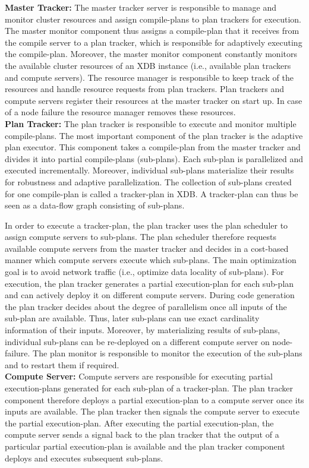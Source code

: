 \documentclass{sig-alternate}
\begin{document}
{\bf Master Tracker:} The master tracker server is responsible to manage and monitor cluster resources and assign compile-plans to plan trackers for execution. The master monitor component thus assigns a compile-plan that it receives from the compile server to a plan tracker, which is responsible for adaptively executing the compile-plan. Moreover, the master monitor component constantly monitors the available cluster resources of an XDB instance (i.e., available plan trackers and compute servers). The resource manager is responsible to keep track of the resources and handle resource requests from plan trackers. Plan trackers and compute servers register their resources at the master tracker on start up. In case of a node failure the resource manager removes these resources. \\

{\bf Plan Tracker:} The plan tracker is responsible to execute and monitor multiple compile-plans. The most important component of the plan tracker is the adaptive plan executor. This component takes a compile-plan from the master tracker and divides it into partial compile-plans (sub-plans). Each sub-plan is parallelized and executed incrementally. Moreover, individual sub-plans materialize their results for robustness and adaptive parallelization.  The collection of sub-plans created for one compile-plan is called a tracker-plan in XDB. A tracker-plan can thus be seen as a data-flow graph consisting of sub-plans. 

In order to execute a tracker-plan, the plan tracker uses the plan scheduler to assign compute servers to sub-plans. The plan scheduler therefore requests available compute servers from the master tracker and decides in a cost-based manner which compute servers execute which sub-plans. The main optimization goal is to avoid network traffic (i.e., optimize data locality of sub-plans). For execution, the plan tracker generates a partial execution-plan for each sub-plan and can actively deploy it on different compute servers. During code generation the plan tracker decides about the degree of parallelism once all inputs of the sub-plan are available. Thus, later sub-plans can use  exact cardinality information of their inputs. Moreover, by materializing results of sub-plans, individual sub-plans can be re-deployed on a different compute server on node-failure. The plan monitor is responsible to monitor the execution of the sub-plans and to restart them if required. \\

{\bf Compute Server: } Compute servers are responsible for executing partial execution-plans generated for each sub-plan of a tracker-plan. The plan tracker component therefore deploys a partial execution-plan to a compute server once its inputs are available. The plan tracker then signals the compute server to execute the partial execution-plan. After executing the partial execution-plan, the compute server sends a signal back to the plan tracker that the output of a particular partial execution-plan is available and the plan tracker component deploys and executes subsequent sub-plans. 
\end{document}
